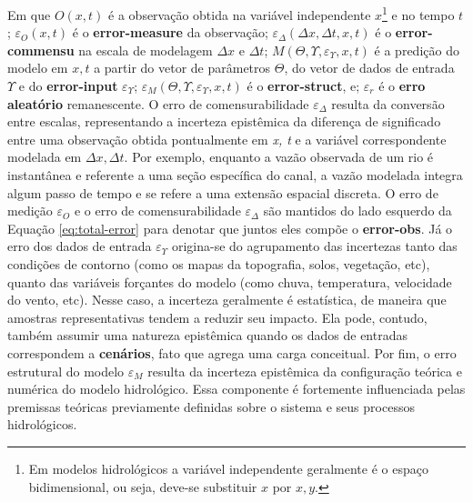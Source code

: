 \documentclass[./main.tex]{subfiles}
\begin{document}
Em que $O(x, t)$ é a observação obtida na variável independente $x$\footnote{Em modelos hidrológicos a variável independente geralmente é o espaço bidimensional, ou seja, deve-se substituir $x$ por $x, y$.} e no tempo $t$; $\varepsilon_{O}(x, t)$ é o \textbf{\gls{error-measure}} da observação; $\varepsilon_{\Delta}(\Delta x,\Delta t, x, t)$ é o\textbf{ \gls{error-commensu}} na escala de modelagem $\Delta x$ e $\Delta t$; $M(\Theta, \Upsilon, \varepsilon_{\Upsilon}, x, t)$ é a predição do modelo em $x, t$ a partir do vetor de parâmetros $\Theta$, do vetor de dados de entrada $\Upsilon$ e do \textbf{\gls{error-input}} $\varepsilon_{\Upsilon}$; $\varepsilon_{M}(\Theta, \Upsilon, \varepsilon_{\Upsilon}, x, t)$ é o \textbf{\gls{error-struct}}, e; $\varepsilon_r$ é o \textbf{erro aleatório} remanescente. O erro de comensurabilidade $\varepsilon_{\Delta}$ resulta da conversão entre escalas, representando a incerteza epistêmica da diferença de significado entre uma observação obtida pontualmente em \textit{x, t} e a variável correspondente modelada em $\Delta x, \Delta t$. Por exemplo, enquanto a vazão observada de um rio é instantânea e referente a uma seção específica do canal, a vazão modelada integra algum passo de tempo e se refere a uma extensão espacial discreta. O erro de medição $\varepsilon_{O}$ e o erro de comensurabilidade $\varepsilon_{\Delta}$ são mantidos do lado esquerdo da Equação \eqref{eq:total-error} para denotar que juntos eles compõe o \textbf{\gls{error-obs}}. Já o erro dos dados de entrada $\varepsilon_\Upsilon$ origina-se do agrupamento das incertezas tanto das condições de contorno (como os mapas da topografia, solos, vegetação, etc), quanto das variáveis forçantes do modelo (como chuva, temperatura, velocidade do vento, etc). Nesse caso, a incerteza geralmente é estatística, de maneira que amostras representativas tendem a reduzir seu impacto. Ela pode, contudo, também assumir uma natureza epistêmica quando os dados de entradas correspondem a \textbf{cenários}, fato que agrega uma carga conceitual. Por fim, o erro estrutural do modelo $\varepsilon_M$ resulta da incerteza epistêmica da configuração teórica e numérica do modelo hidrológico. Essa componente é fortemente influenciada pelas premissas teóricas previamente definidas sobre o sistema e seus processos hidrológicos.
\end{document}
